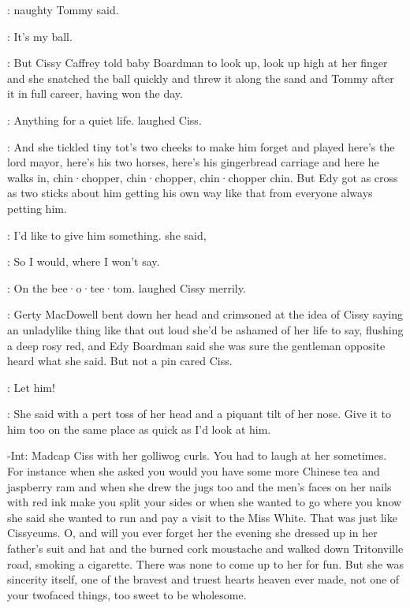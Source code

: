 :
naughty Tommy said.

\tommy:
It's my ball.

:
But Cissy Caffrey told baby Boardman to look up,
look up high at her
finger and she snatched the ball quickly and threw it along the sand and
Tommy after it in full career,
having won the day.

\cissy:
Anything for a quiet life.
laughed Ciss.

:
And she tickled tiny tot's two cheeks to make him forget and played here's
the lord mayor,
here's his two horses,
here's his gingerbread carriage
and here he walks in,
chin·chopper,
chin·chopper,
chin·chopper chin.
But Edy
got as cross as two sticks
about him getting his own way like that from
everyone always petting him.

\edy:
I'd like to give him something.
she said,

\edy:
So I would,
where I won't say.

\cissy:
On the bee·o·tee·tom.
laughed Cissy merrily.

:
Gerty MacDowell bent down her head and crimsoned at the idea of Cissy
saying an unladylike thing like that out loud she'd be ashamed of her
life to say,
flushing a deep rosy red,
and Edy Boardman said she was sure
the gentleman opposite heard what she said.
But not a pin cared Ciss.

\cissy:
Let him!

:
She said with a pert toss of her head and a piquant tilt of her
nose.
Give it to him too on the same place as quick as I'd look at him.

\gerty-Int:
Madcap Ciss with her golliwog curls.
You had to laugh at her
sometimes.
For instance when she asked you would you have some more
Chinese tea and jaspberry ram and when she drew the jugs too and the men's
faces on her nails with red ink make you split your sides or when she
wanted to go where you know she said she wanted to run and pay a visit to
the Miss White.
That was just like Cissycums.
O,
and will you ever forget
her the evening she dressed up in her father's suit and hat and the burned
cork moustache and walked down Tritonville road,
smoking a cigarette.
There was none to come up to her for fun.
But she was sincerity itself,
one of the bravest and truest hearts heaven ever made,
not one of your
twofaced things,
too sweet to be wholesome.

